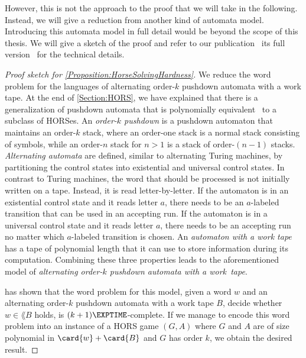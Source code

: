\documentclass[../../diss.tex]{subfiles}
\begin{document}
However, this is not the approach to the proof that we will take in the following.
Instead, we will give a reduction from another kind of automata model.
Introducing this automata model in full detail would be beyond the scope of this thesis.
We will give a sketch of the proof and refer to our publication~\cite{HagueMM17} \resp its full version~\cite{HagueMM17a} for the technical details.

\begin{proof}[Proof sketch for \cref{Proposition:HorseSolvingHardness}]
    We reduce the word problem for the languages of alternating order-$k$ pushdown automata with a work tape.
    At the end of \cref{Section:HORS}, we have explained that there is a generalization of pushdown automata that is polynomially equivalent~\cite{KnapikNU02} to a subclass of HORSes.
    An \emph{order-$k$ pushdown} is a pushdown automaton that maintains an order-$k$ stack, where an order-one stack is a normal stack consisting of symbols, while an order-$n$ stack for $n > 1$ is a stack of order-$(n-1)$ stacks.
    \emph{Alternating automata} are defined, similar to alternating Turing machines, by partitioning the control states into existential and universal control states.
    In contrast to Turing machines, the word that should be processed is not initially written on a tape.
    Instead, it is read letter-by-letter.
    If the automaton is in an existential control state and it reads letter $a$, there needs to be an $a$-labeled transition that can be used in an accepting run.
    If the automaton is in a universal control state and it reads letter $a$, there needs to be an accepting run no matter which $a$-labeled transition is chosen.
    An \emph{automaton with a work tape} has a tape of polynomial length that it can use to store information during its computation.
    Combining these three properties leads to the aforementioned model of \emph{alternating order-$k$ pushdown automata with a work~tape}.

     has shown that the word problem for this model, given a word $w$ and an alternating order-$k$ pushdown automata with a work tape $B$, decide whether $w \in \lang{B}$ holds, is $(k+1)\EXPTIME$-complete.
    If we manage to encode this word problem into an instance of a HORS game $(G,A)$ where $G$ and $A$ are of size polynomial in $\card{w} + \card{B}$ and $G$ has order $k$, we obtain the desired result.


\end{proof}
\end{document}
